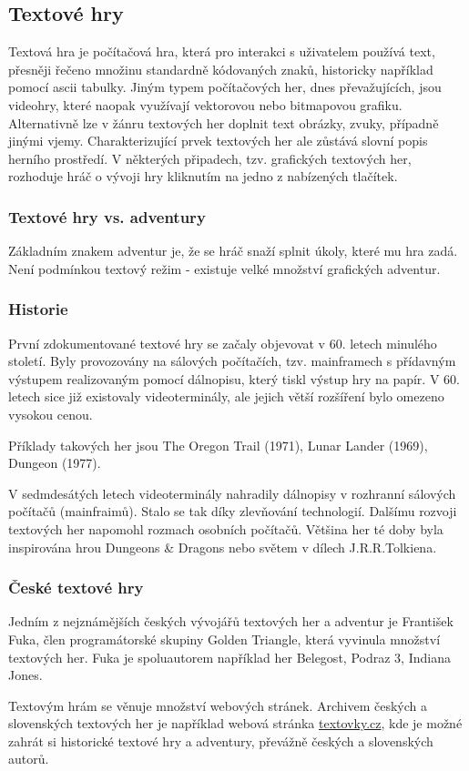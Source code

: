 \documentclass[main.tex]{subfiles}
\begin{document}
\subsection{Textové hry}
\label{textovky}
Textová hra je počítačová hra, která pro interakci s uživatelem používá text, přesněji řečeno množinu standardně kódovaných znaků, historicky například pomocí ascii tabulky. Jiným typem počítačových her, dnes převažujících, jsou videohry, které naopak využívají vektorovou nebo bitmapovou grafiku. \cite{web:wik:en:textgame} Alternativně lze v žánru textových her doplnit text obrázky, zvuky, případně jinými vjemy. Charakterizující prvek textových her ale zůstává slovní popis herního prostředí. V některých připadech, tzv. grafických textových her, rozhoduje hráč o vývoji hry kliknutím na jedno z nabízených tlačítek.\cite{web:wik:cz:textovahra}

\subsubsection{Textové hry vs. adventury}
Základním znakem adventur je, že se hráč snaží splnit úkoly, které mu hra zadá. Není podmínkou textový režim - existuje velké množství grafických adventur. \cite{web:wik:cz:adventura}

\subsubsection{Historie}
První zdokumentované textové hry se začaly objevovat v 60. letech minulého století. Byly provozovány na sálových počítačích, tzv. mainframech s přídavným výstupem realizovaným pomocí dálnopisu, který tiskl výstup hry na papír. V 60. letech sice již existovaly videoterminály, ale jejich větší rozšíření bylo omezeno vysokou cenou. \cite{web:pcmag:en:oldcomputergames, web:wik:en:textgame}


Příklady takových her jsou The Oregon Trail (1971), Lunar Lander (1969), Dungeon (1977). \cite{web:pcmag:en:oldcomputergames}

V sedmdesátých letech videoterminály nahradily dálnopisy v rozhranní sálových počítačů (mainfraimů). Stalo se tak díky zlevňování technologií. Dalšímu rozvoji textových her napomohl rozmach osobních počítačů. Většina her té doby byla inspirována hrou Dungeons \& Dragons nebo světem v dílech J.R.R.Tolkiena. \cite{web:pcgamer:en:historyrpgs}  


\subsubsection{České textové hry}
Jedním z nejznámějších českých vývojářů textových her a adventur je František Fuka, člen programátorské skupiny Golden Triangle, která vyvinula množství textových her. Fuka je spoluautorem například her Belegost, Podraz 3, Indiana Jones. \cite{web:wik:cz:fuka}

Textovým hrám se věnuje množství webových stránek. Archivem českých a slovenských textových her je například webová stránka \href{https://www.textovky.cz}{textovky.cz}, kde je možné zahrát si historické textové hry a adventury, převážně českých a slovenských autorů. \cite{web:text:cz:archiv}
\end{document}
